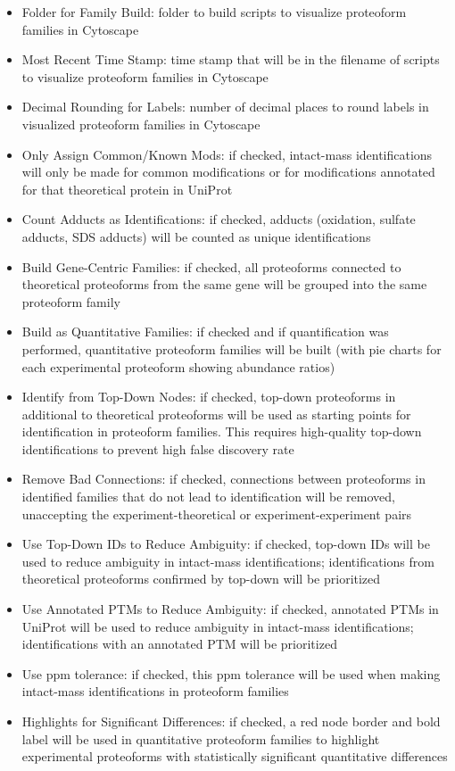 \begin{itemize}
\item Folder for Family Build: folder to build scripts to visualize proteoform families in Cytoscape
\item Most Recent Time Stamp: time stamp that will be in the filename of scripts to visualize proteoform families in Cytoscape
\item Decimal Rounding for Labels: number of decimal places to round labels in visualized proteoform families in Cytoscape
\item Only Assign Common/Known Mods: if checked, intact-mass identifications will only be made for common modifications or for modifications annotated for that theoretical protein in UniProt
\item Count Adducts as Identifications: if checked, adducts (oxidation, sulfate adducts, SDS adducts) will be counted as unique identifications
\item Build Gene-Centric Families: if checked, all proteoforms connected to theoretical proteoforms from the same gene will be grouped into the same proteoform family
\item Build as Quantitative Families: if checked and if quantification was performed, quantitative proteoform families will be built (with pie charts for each experimental proteoform showing abundance ratios)
\item Identify from Top-Down Nodes: if checked, top-down proteoforms in additional to theoretical proteoforms will be used as starting points for identification in proteoform families. This requires high-quality top-down identifications to prevent high false discovery rate
\item Remove Bad Connections: if checked, connections between proteoforms in identified families that do not lead to identification will be removed, unaccepting the experiment-theoretical or experiment-experiment pairs
\item Use Top-Down IDs to Reduce Ambiguity: if checked, top-down IDs will be used to reduce ambiguity in intact-mass identifications; identifications from theoretical proteoforms confirmed by top-down will be prioritized
\item Use Annotated PTMs to Reduce Ambiguity: if checked, annotated PTMs in UniProt will be used to reduce ambiguity in intact-mass identifications; identifications with an annotated PTM will be prioritized
\item Use ppm tolerance: if checked, this ppm tolerance will be used when making intact-mass identifications in proteoform families
\item Highlights for Significant Differences: if checked, a red node border and bold label will be used in quantitative proteoform families to highlight experimental proteoforms with statistically significant quantitative differences
\end{itemize}
\pagebreak
